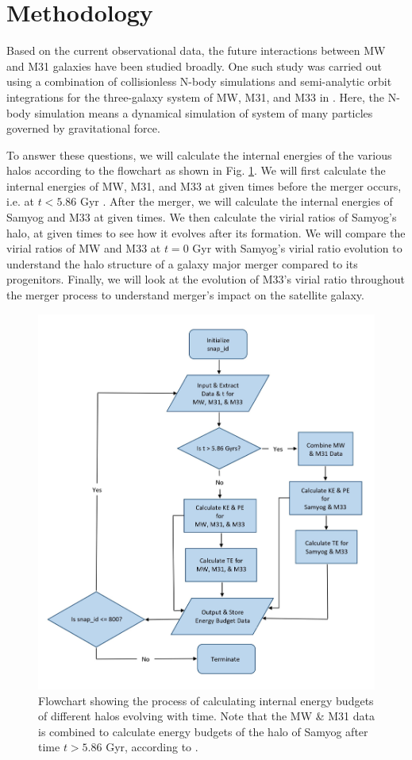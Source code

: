 \documentclass[twocolumn]{aastex631}
\begin{document}

\section{Methodology}
\label{sec:method}

Based on the current observational data, the future interactions between MW and M31 galaxies have been studied broadly. One such study was carried out using a combination of collisionless N-body simulations and semi-analytic orbit integrations for the three-galaxy system of MW, M31, and M33 in \cite{simulation}. Here, the N-body simulation means a dynamical simulation of system of many particles governed by gravitational force.

To answer these questions, we will calculate the internal energies of the various halos according to the flowchart as shown in Fig. \ref{fig:flowchart}. We will first calculate the internal energies of MW, M31, and M33 at given times before the merger occurs, i.e. at $t < 5.86$ Gyr \citep[see][]{simulation}. After the merger, we will calculate the internal energies of Samyog and M33 at given times. We then calculate the virial ratios of Samyog's halo, at given times to see how it evolves after its formation. We will compare the virial ratios of MW and M33 at $t=0$ Gyr with Samyog's virial ratio evolution to understand the halo structure of a galaxy major merger compared to its progenitors. Finally, we will look at the evolution of M33's virial ratio throughout the merger process to understand merger's impact on the satellite galaxy.  

\begin{figure}[htbp]
\includegraphics[width=.5\textwidth]{flowchart.jpg}
\caption{Flowchart showing the process of calculating internal energy budgets of different halos evolving with time. Note that the MW & M31 data is combined to calculate energy budgets of the halo of Samyog after time $t > 5.86$ Gyr, according to \cite{simulation}. 
\label{fig:flowchart}}
\end{figure}
\end{document}
